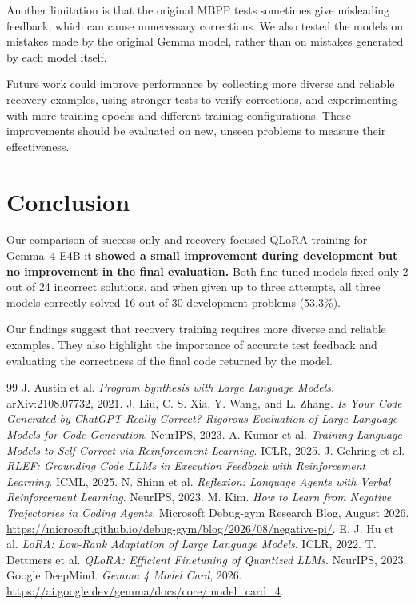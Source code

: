 \documentclass[10pt,twocolumn]{article}
\newcommand{\gmodel}{Gemma~4 E4B-it}
\begin{document}
Another limitation is that the original MBPP tests sometimes give misleading feedback, which can cause unnecessary corrections. We also tested the models on mistakes made by the original Gemma model, rather than on mistakes generated by each model itself.

Future work could improve performance by collecting more diverse and reliable recovery examples, using stronger tests to verify corrections, and experimenting with more training epochs and different training configurations. These improvements should be evaluated on new, unseen problems to measure their effectiveness.


\section{Conclusion}

Our comparison of success-only and recovery-focused QLoRA training for \gmodel{} \textbf{showed a small improvement during development but no improvement in the final evaluation.} Both fine-tuned models fixed only 2 out of 24 incorrect solutions, and when given up to three attempts, all three models correctly solved 16 out of 30 development problems (53.3\%).

Our findings suggest that recovery training requires more diverse and reliable examples. They also highlight the importance of accurate test feedback and evaluating the correctness of the final code returned by the model.


\vspace{-.5em}
\begin{thebibliography}{99}\footnotesize\setlength{\itemsep}{1pt}
 J. Austin et al. \emph{Program Synthesis with Large Language Models}. arXiv:2108.07732, 2021.
 J. Liu, C. S. Xia, Y. Wang, and L. Zhang. \emph{Is Your Code Generated by ChatGPT Really Correct? Rigorous Evaluation of Large Language Models for Code Generation}. NeurIPS, 2023.
 A. Kumar et al. \emph{Training Language Models to Self-Correct via Reinforcement Learning}. ICLR, 2025.
 J. Gehring et al. \emph{RLEF: Grounding Code LLMs in Execution Feedback with Reinforcement Learning}. ICML, 2025.
 N. Shinn et al. \emph{Reflexion: Language Agents with Verbal Reinforcement Learning}. NeurIPS, 2023.
 M. Kim. \emph{How to Learn from Negative Trajectories in Coding Agents}. Microsoft Debug-gym Research Blog, August 2026. \url{https://microsoft.github.io/debug-gym/blog/2026/08/negative-pi/}.
 E. J. Hu et al. \emph{LoRA: Low-Rank Adaptation of Large Language Models}. ICLR, 2022.
 T. Dettmers et al. \emph{QLoRA: Efficient Finetuning of Quantized LLMs}. NeurIPS, 2023.
 Google DeepMind. \emph{Gemma 4 Model Card}, 2026. \url{https://ai.google.dev/gemma/docs/core/model_card_4}.
\end{thebibliography}
\end{document}
